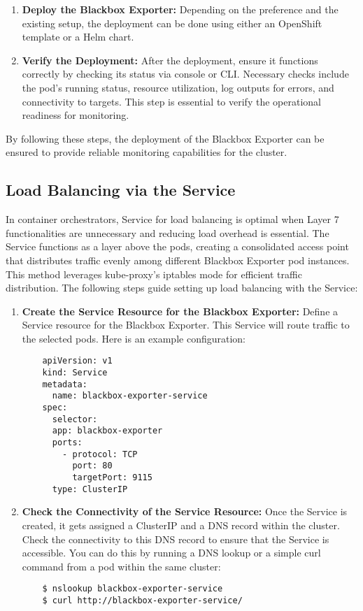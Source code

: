 \begin{enumerate}
    \item \textbf{Deploy the Blackbox Exporter:}
    Depending on the preference and the existing setup, the deployment can be done using either an OpenShift template or a Helm chart. 
    \item \textbf{Verify the Deployment:}
    After the deployment, ensure it functions correctly by checking its status via console or \ac{CLI}. Necessary checks include the pod's running status, resource utilization, log outputs for errors, and connectivity to targets. This step is essential to verify the operational readiness for monitoring. 
\end{enumerate}

By following these steps, the deployment of the Blackbox Exporter can be ensured to provide reliable monitoring capabilities for the cluster.

\subsection{Load Balancing via the Service}

In container orchestrators, Service for load balancing is optimal when Layer 7 functionalities are unnecessary and reducing load overhead is essential. The Service functions as a layer above the pods, creating a consolidated access point that distributes traffic evenly among different Blackbox Exporter pod instances. This method leverages kube-proxy's iptables mode for efficient traffic distribution. The following steps guide setting up load balancing with the Service: 

\begin{enumerate}
    \item \textbf{Create the Service Resource for the Blackbox Exporter:}
    Define a Service resource for the Blackbox Exporter. This Service will route traffic to the selected pods. Here is an example configuration:
    \begin{verbatim}
    apiVersion: v1
    kind: Service
    metadata:
      name: blackbox-exporter-service
    spec:
      selector:
      app: blackbox-exporter
      ports:
        - protocol: TCP
          port: 80
          targetPort: 9115
      type: ClusterIP
    \end{verbatim}
    \item \textbf{Check the Connectivity of the Service Resource:}
    Once the Service is created, it gets assigned a ClusterIP and a DNS record within the cluster. Check the connectivity to this DNS record to ensure that the Service is accessible. You can do this by running a DNS lookup or a simple curl command from a pod within the same cluster: 
    \begin{verbatim}
    $ nslookup blackbox-exporter-service
    $ curl http://blackbox-exporter-service/
    \end{verbatim}
\end{enumerate}

